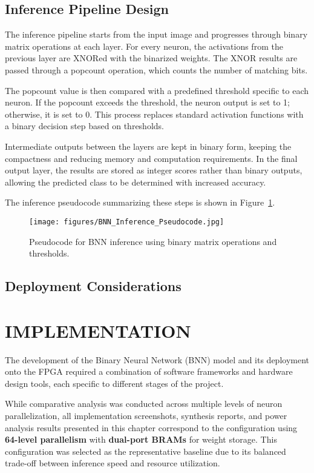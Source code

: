 \documentclass[a4paper,12pt]{report}
\begin{document}
\clearpage
\section{Inference Pipeline Design}
The inference pipeline starts from the input image and progresses through binary matrix operations at each layer. For every neuron, the activations from the previous layer are XNORed with the binarized weights. The XNOR results are passed through a popcount operation, which counts the number of matching bits.

The popcount value is then compared with a predefined threshold specific to each neuron. If the popcount exceeds the threshold, the neuron output is set to 1; otherwise, it is set to 0. This process replaces standard activation functions with a binary decision step based on thresholds.

Intermediate outputs between the layers are kept in binary form, keeping the compactness and reducing memory and computation requirements. In the final output layer, the results are stored as integer scores rather than binary outputs, allowing the predicted class to be determined with increased accuracy.

The inference pseudocode summarizing these steps is shown in Figure~\ref{fig:bnn_inference_pseudocode}.
\begin{figure}[htbp]
    \centering
    \texttt{[image: figures/BNN\_Inference\_Pseudocode.jpg]}
    \caption{Pseudocode for BNN inference using binary matrix operations and thresholds.}
    \label{fig:bnn_inference_pseudocode}
\end{figure}

\clearpage
\section{Deployment Considerations}



\clearpage
\chapter{IMPLEMENTATION}
\label{chapter:implementation}
The development of the Binary Neural Network (BNN) model and its deployment onto the FPGA required a combination of software frameworks and hardware design tools, each specific to different stages of the project.

While comparative analysis was conducted across multiple levels of neuron parallelization, all implementation screenshots, synthesis reports, and power analysis results presented in this chapter correspond to the configuration using \textbf{64-level parallelism} with \textbf{dual-port BRAMs} for weight storage. This configuration was selected as the representative baseline due to its balanced trade-off between inference speed and resource utilization.
\end{document}
